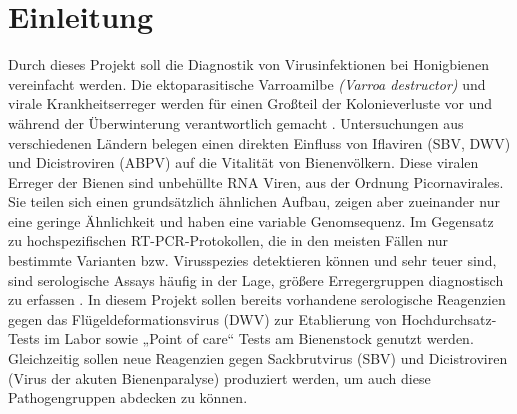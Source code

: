 
\section{Einleitung}
Durch dieses Projekt soll die Diagnostik von Virusinfektionen bei Honigbienen vereinfacht werden. Die ektoparasitische Varroamilbe \textit{(Varroa destructor)} und virale Krankheitserreger werden für einen Großteil der Kolonieverluste vor \citep{dainat2012} und während der Überwinterung verantwortlich gemacht \citep{Kielmanowicz2015}. Untersuchungen aus verschiedenen Ländern belegen einen direkten Einfluss von Iflaviren (SBV, DWV) und Dicistroviren (ABPV) auf die Vitalität von Bienenvölkern. Diese viralen Erreger der Bienen sind unbehüllte RNA Viren, aus der Ordnung Picornavirales. Sie teilen sich einen grundsätzlich ähnlichen Aufbau, zeigen aber zueinander nur eine geringe Ähnlichkeit und haben eine variable Genomsequenz. Im Gegensatz zu hochspezifischen RT-PCR-Protokollen, die in den meisten Fällen nur bestimmte Varianten bzw. Virusspezies detektieren können und sehr teuer sind, sind serologische Assays häufig in der Lage, größere Erregergruppen diagnostisch zu erfassen . In diesem Projekt sollen bereits vorhandene serologische Reagenzien gegen das Flügeldeformationsvirus (DWV) zur Etablierung von Hochdurchsatz-Tests im Labor sowie „Point of care“ Tests am Bienenstock genutzt werden. Gleichzeitig sollen neue Reagenzien gegen Sackbrutvirus (SBV) und Dicistroviren (Virus der akuten Bienenparalyse) produziert werden, um auch diese Pathogengruppen abdecken zu können. 
